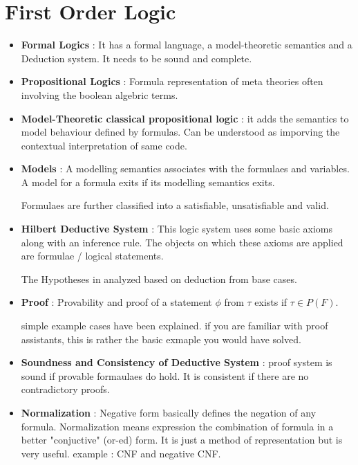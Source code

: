 \chapter{First Order Logic}

\begin{itemize}
	\item{\textbf{Formal Logics} : It has a formal language, a model-theoretic semantics and a Deduction system. It needs to be sound and complete.
	}

	\item{\textbf{Propositional Logics} : Formula representation of meta theories often involving the boolean algebric terms.
	}

	\item{\textbf{Model-Theoretic classical propositional logic} : it adds the semantics to model behaviour defined by formulas. Can be understood as imporving the contextual interpretation of same code.
	}
	
	\item{\textbf{Models} : A modelling semantics associates with the formulaes and variables. A model for a formula exits if its modelling	 semantics exits.

	Formulaes are further classified into a satisfiable, unsatisfiable and valid.
	}
	
	\item{\textbf{Hilbert Deductive System} : This logic system uses some basic axioms along with an inference rule. The objects on which these axioms are applied are formulae / logical statements.

	The Hypotheses in analyzed based on deduction from base cases.
	}
	
	\item{\textbf{Proof} : Provability and proof of a statement $\phi$ from $\tau$ exists if  $\tau \in P(F)$.

	simple example cases have been explained. if you are familiar with proof assistants, this is rather the basic exmaple you would have solved.
	}
	
	\item{\textbf{Soundness and Consistency of Deductive System} : proof system is sound if provable formaulaes do hold. It is consistent if  there are no contradictory proofs. 
	}
	
	\item{\textbf{Normalization} : Negative form basically defines the negation of any formula. Normalization means expression the combination of formula in a better "conjuctive" (or-ed) form. It is just a method of representation but is very useful. example : CNF and negative CNF.
	}
	

\end{itemize}
